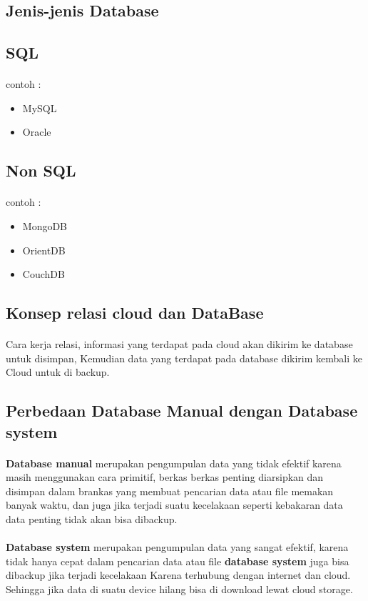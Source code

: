 \documentclass[a4paper]{article}
\begin{document}
	\subsection{Jenis-jenis Database}
		\subsection*{SQL}
	\paragraph{}
	contoh :
\begin{itemize}

	\item MySQL
	\item Oracle
\end{itemize}

\subsection*{Non SQL}
\paragraph{}
contoh :
	\begin{itemize}
	\item MongoDB
	\item OrientDB
	\item CouchDB
\end{itemize}

	\subsection{Konsep relasi cloud  dan DataBase}
	\paragraph{}
	Cara kerja relasi, informasi yang terdapat pada cloud akan dikirim ke database untuk disimpan, Kemudian data yang terdapat pada database dikirim kembali ke Cloud untuk di backup.
	
	\subsection{Perbedaan Database Manual dengan Database system}
	\paragraph{}
	\textbf{Database manual} merupakan pengumpulan data yang tidak efektif karena masih menggunakan cara primitif, berkas berkas penting diarsipkan dan disimpan dalam brankas yang membuat pencarian data atau file memakan banyak waktu, dan juga jika terjadi suatu kecelakaan seperti kebakaran data data penting tidak akan bisa dibackup.
	\paragraph{}
	\textbf{Database system} merupakan pengumpulan data yang sangat efektif, karena tidak hanya cepat dalam pencarian data atau file \textbf{database system} juga bisa dibackup jika terjadi kecelakaan Karena terhubung dengan internet dan cloud. Sehingga jika data di suatu device hilang bisa di download lewat cloud storage.
	
\end{document}
